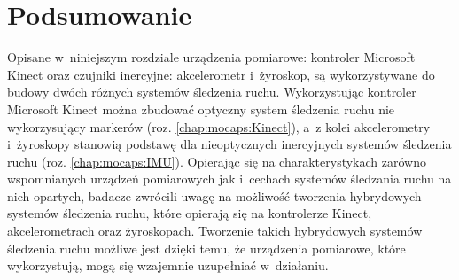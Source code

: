 \section{Podsumowanie}
Opisane w~niniejszym rozdziale urządzenia pomiarowe: kontroler Microsoft Kinect oraz czujniki inercyjne: akcelerometr i~żyroskop, są wykorzystywane do budowy dwóch różnych systemów śledzenia ruchu. Wykorzystując kontroler Microsoft Kinect można zbudować optyczny system śledzenia ruchu nie wykorzysujący markerów (roz. \ref{chap:mocaps:Kinect}), a~z kolei akcelerometry i~żyroskopy stanowią podstawę dla nieoptycznych inercyjnych systemów śledzenia ruchu (roz. \ref{chap:mocaps:IMU}). Opierając się na charakterystykach zarówno wspomnianych urządzeń pomiarowych jak i~cechach systemów śledzania ruchu na nich opartych, badacze zwrócili uwagę na możliwość tworzenia hybrydowych systemów śledzenia ruchu, które opierają się na kontrolerze Kinect, akcelerometrach oraz żyroskopach. Tworzenie takich hybrydowych systemów śledzenia ruchu możliwe jest dzięki temu, że urządzenia pomiarowe, które wykorzystują, mogą się wzajemnie uzupełniać w~działaniu.
		
		
		
		
		
		
		
